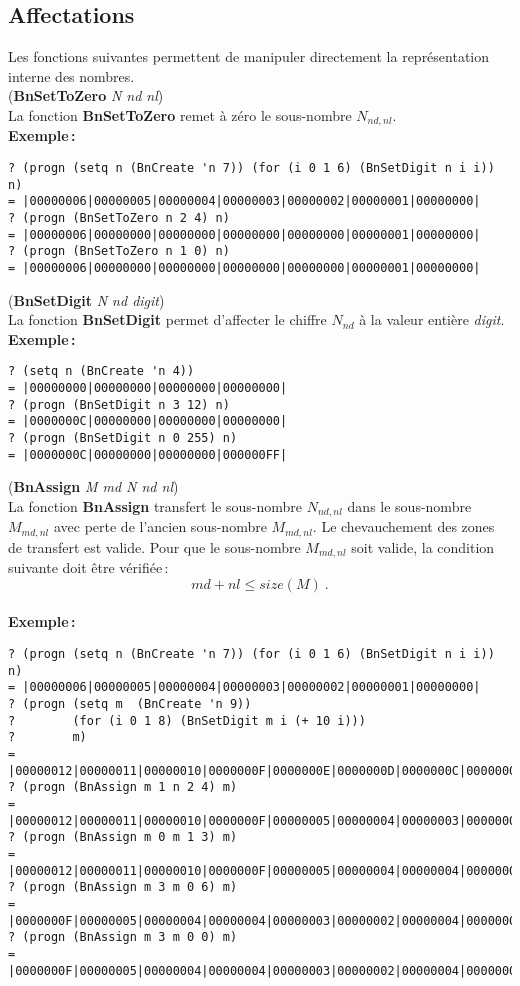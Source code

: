 \subsection{Affectations}
Les fonctions suivantes permettent de manipuler directement la repr\'esentation
interne des nombres.
\\[24pt]
({\bf BnSetToZero} {\em N nd nl})
\\[12pt]
La fonction {\bf BnSetToZero} remet \`a z\'ero le sous-nombre $N_{nd,nl}$.
\\[18pt]
{\bf Exemple\,:}
\begin{verbatim}
? (progn (setq n (BnCreate 'n 7)) (for (i 0 1 6) (BnSetDigit n i i)) n)
= |00000006|00000005|00000004|00000003|00000002|00000001|00000000|
? (progn (BnSetToZero n 2 4) n)
= |00000006|00000000|00000000|00000000|00000000|00000001|00000000|
? (progn (BnSetToZero n 1 0) n)
= |00000006|00000000|00000000|00000000|00000000|00000001|00000000|
\end{verbatim}
\vspace*{24pt}
({\bf BnSetDigit} {\em N nd digit})
\\[12pt]
La fonction {\bf BnSetDigit} permet d'affecter le chiffre $N_{nd}$
\`a la valeur enti\`ere {\em digit}.
\\[18pt]
{\bf Exemple\,:}
\begin{verbatim}
? (setq n (BnCreate 'n 4))
= |00000000|00000000|00000000|00000000|
? (progn (BnSetDigit n 3 12) n)
= |0000000C|00000000|00000000|00000000|
? (progn (BnSetDigit n 0 255) n)
= |0000000C|00000000|00000000|000000FF|
\end{verbatim}
\vspace*{24pt}
({\bf BnAssign} {\em M md N nd nl})
\\[12pt]
La fonction {\bf BnAssign} transfert le sous-nombre $N_{nd,nl}$ dans le
sous-nombre $M_{md,nl}$ avec perte de l'ancien sous-nombre
$M_{md,nl}$. Le chevauchement des zones de transfert est valide.
Pour que le sous-nombre $M_{md,nl}$ soit valide, la condition suivante
doit \^etre v\'erifi\'ee\,:
\[ md + nl \leq size(M)\ .\]
\\[18pt]
{\bf Exemple\,:}
\begin{verbatim}
? (progn (setq n (BnCreate 'n 7)) (for (i 0 1 6) (BnSetDigit n i i)) n)
= |00000006|00000005|00000004|00000003|00000002|00000001|00000000|
? (progn (setq m  (BnCreate 'n 9))
?        (for (i 0 1 8) (BnSetDigit m i (+ 10 i)))
?        m)
= |00000012|00000011|00000010|0000000F|0000000E|0000000D|0000000C|0000000B|0000000A|
? (progn (BnAssign m 1 n 2 4) m)
= |00000012|00000011|00000010|0000000F|00000005|00000004|00000003|00000002|0000000A|
? (progn (BnAssign m 0 m 1 3) m)
= |00000012|00000011|00000010|0000000F|00000005|00000004|00000004|00000003|00000002|
? (progn (BnAssign m 3 m 0 6) m)
= |0000000F|00000005|00000004|00000004|00000003|00000002|00000004|00000003|00000002|
? (progn (BnAssign m 3 m 0 0) m)
= |0000000F|00000005|00000004|00000004|00000003|00000002|00000004|00000003|00000002|
\end{verbatim}
\vspace*{15pt}

